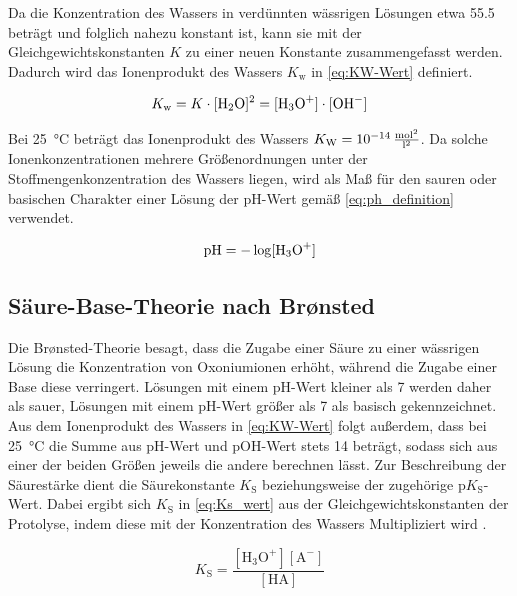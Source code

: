Da die Konzentration des Wassers in verdünnten wässrigen Lösungen etwa \SI{55,5}{} beträgt und folglich nahezu konstant ist, kann sie mit der Gleichgewichtskonstanten $K$ zu einer neuen Konstante zusammengefasst werden. Dadurch wird das Ionenprodukt des Wassers $K_{\mathrm{w}}$ in \eqref{eq:KW-Wert} definiert. \cite{skript}

\begin{equation}
    K_{\mathrm{w}} = K \cdot [\ce{H2O}]^2 = [\ce{H3O+}] \cdot [\ce{OH-}] %
    \label{eq:KW-Wert}
\end{equation}

Bei \SI{25}{\celsius} beträgt das Ionenprodukt des Wassers $K_\mathrm{W} = \SI{e-14}{  \frac{\mole\squared}{l\squared}}$. Da solche Ionenkonzentrationen mehrere Größenordnungen unter der Stoffmengenkonzentration des Wassers liegen, wird als Maß für den sauren oder basischen Charakter einer Lösung der pH-Wert gemäß \eqref{eq:ph_definition} verwendet. \cite{skript}

\begin{equation}
    \mathrm{pH} = -\log [\ce{H3O+}]
    \label{eq:ph_definition}
\end{equation}

\subsection{Säure-Base-Theorie nach Brønsted}

Die Brønsted-Theorie besagt, dass die Zugabe einer Säure zu einer wässrigen Lösung die Konzentration von Oxoniumionen erhöht, während die Zugabe einer Base diese verringert.
Lösungen mit einem $\text{pH}$-Wert kleiner als 7 werden daher als sauer, Lösungen mit einem $\text{pH}$-Wert größer als 7 als basisch gekennzeichnet.
Aus dem Ionenprodukt des Wassers in \eqref{eq:KW-Wert} folgt außerdem, dass bei \SI{25}{\celsius} die Summe aus $\text{pH}$-Wert und pOH-Wert stets 14 beträgt, sodass sich aus einer der beiden Größen jeweils die andere berechnen lässt. Zur Beschreibung der Säurestärke dient die Säurekonstante $K_\mathrm{S}$ beziehungsweise der zugehörige $\text{p}K_{\text{S}}$-Wert. Dabei ergibt sich $K_\mathrm{S}$ in \eqref{eq:Ks_wert} aus der Gleichgewichtskonstanten der Protolyse, indem diese mit der Konzentration des Wassers Multipliziert wird \cite{skript}.

\begin{equation}
    K_{\text{S}}=\frac{[\text{H}_{3}\text{O}^{+}][\text{A}^{-}]}{[\text{HA}]}
    \label{eq:Ks_wert}
\end{equation}

